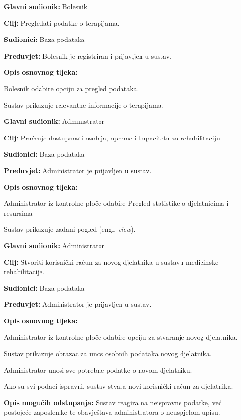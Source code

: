 	\item \textbf{Glavni sudionik:} Bolesnik
	\item \textbf{Cilj:} Pregledati podatke o terapijama.
	\item \textbf{Sudionici:} Baza podataka
	\item \textbf{Preduvjet:} Bolesnik je registriran i prijavljen u sustav.
	\item \textbf{Opis osnovnog tijeka:}
	\begin{packed_enum}
		\item Bolesnik odabire opciju za pregled podataka.
		\item Sustav prikazuje relevantne informacije o terapijama.
	\end{packed_enum}
\closeusecase


	\item \textbf{Glavni sudionik:} Administrator 
	\item \textbf{Cilj:} Praćenje dostupnosti osoblja, opreme i kapaciteta za rehabilitaciju.
	\item \textbf{Sudionici:} Baza podataka
	\item \textbf{Preduvjet:} Administrator je prijavljen u sustav.
	\item \textbf{Opis osnovnog tijeka:}
	\begin{packed_enum}
		\item Administrator iz kontrolne ploče odabire Pregled statistike o djelatnicima i resursima
		\item Sustav prikazuje zadani pogled (engl. \textit{view}). 
	\end{packed_enum}
\closeusecase


	\item \textbf{Glavni sudionik:} Administrator
	\item \textbf{Cilj:} Stvoriti korisnički račun za novog djelatnika u sustavu medicinske rehabilitacije.
	\item \textbf{Sudionici:} Baza podataka
	\item \textbf{Preduvjet:} Administrator je prijavljen u sustav.
	\item \textbf{Opis osnovnog tijeka:}
	\begin{packed_enum}
		\item Administrator iz kontrolne ploče odabire opciju za stvaranje novog djelatnika.
		\item Sustav prikazuje obrazac za unos osobnih podataka novog djelatnika.
		\item Administrator unosi sve potrebne podatke o novom djelatniku.
		\item Ako su svi podaci ispravni, sustav stvara novi korisnički račun za djelatnika.
	\end{packed_enum}
	\item \textbf{Opis mogućih odstupanja:}
	Sustav reagira na neispravne podatke, već postojeće zaposlenike te obavještava administratora o neuspjelom upisu.
\closeusecase


